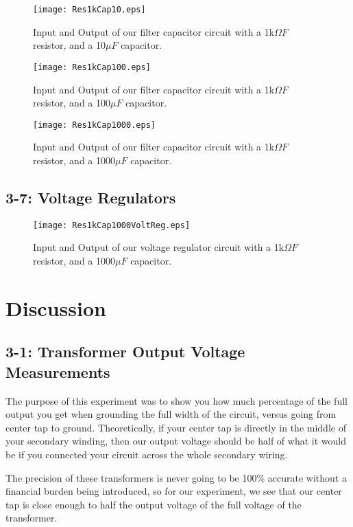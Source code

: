 \documentclass[%
 aip,
 jmp,
 amsmath,
 amssymb,
 reprint,%
 numerical,
 longbibliography,
]{revtex4-1}
\begin{document}
	\begin{figure}[H]
	\texttt{[image: Res1kCap10.eps]}
	\caption{Input and Output of our filter capacitor circuit with a
	1k$\Omega F$ resistor, and a 10$\mu F$ capacitor.}
	\end{figure}
	
	\begin{figure}[H]
	\texttt{[image: Res1kCap100.eps]}
	\caption{Input and Output of our filter capacitor circuit with a
	1k$\Omega F$ resistor, and a 100$\mu F$ capacitor.}
	\end{figure}
	
	\begin{figure}[H]
	\texttt{[image: Res1kCap1000.eps]}
	\caption{Input and Output of our filter capacitor circuit with a
	1k$\Omega F$ resistor, and a 1000$\mu F$ capacitor.}
	\end{figure}
	
	\subsection{3-7: Voltage Regulators}
	
	\begin{figure}[H]
	\texttt{[image: Res1kCap1000VoltReg.eps]}
	\caption{Input and Output of our voltage regulator circuit with a
	1k$\Omega F$ resistor, and a 1000$\mu F$ capacitor.}
	\end{figure}	
	
\section{Discussion}
	
	\subsection{3-1: Transformer Output Voltage Measurements}
	
	The purpose of this experiment was to show you how much percentage of the full output you get
	when grounding the full width of the circuit, versus going from center tap to ground.
	Theoretically, if your center tap is directly in the middle of your secondary winding, then our
	output voltage should be half of what it would be if you connected your circuit across the whole
	secondary wiring.
	
	The precision of these transformers is never going to be 100\% accurate without a financial
	burden being introduced, so for our experiment, we see that our center tap is close enough
	to half the output voltage of the full voltage of the transformer.
\end{document}
